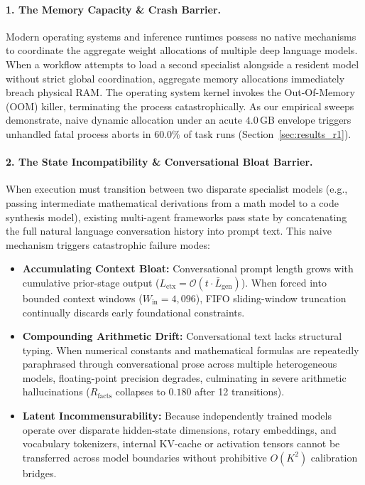 \paragraph{1. The Memory Capacity \& Crash Barrier.}
Modern operating systems and inference runtimes possess no native mechanisms to coordinate the aggregate weight allocations of multiple deep language models. When a workflow attempts to load a second specialist alongside a resident model without strict global coordination, aggregate memory allocations immediately breach physical RAM. The operating system kernel invokes the Out-Of-Memory (OOM) killer, terminating the process catastrophically. As our empirical sweeps demonstrate, naive dynamic allocation under an acute $4.0$\,GB envelope triggers unhandled fatal process aborts in $60.0\%$ of task runs (Section~\ref{sec:results_r1}).

\paragraph{2. The State Incompatibility \& Conversational Bloat Barrier.}
When execution must transition between two disparate specialist models (e.g., passing intermediate mathematical derivations from a math model to a code synthesis model), existing multi-agent frameworks pass state by concatenating the full natural language conversation history into prompt text. This naive mechanism triggers catastrophic failure modes:
\begin{itemize}
    \item \textbf{Accumulating Context Bloat:} Conversational prompt length grows with cumulative prior-stage output ($L_{\text{ctx}} = \mathcal{O}(t \cdot \bar{L}_{\text{gen}})$). When forced into bounded context windows ($W_{\text{in}} = 4,096$), FIFO sliding-window truncation continually discards early foundational constraints.
    \item \textbf{Compounding Arithmetic Drift:} Conversational text lacks structural typing. When numerical constants and mathematical formulas are repeatedly paraphrased through conversational prose across multiple heterogeneous models, floating-point precision degrades, culminating in severe arithmetic hallucinations ($R_{\text{facts}}$ collapses to $0.180$ after 12 transitions).
    \item \textbf{Latent Incommensurability:} Because independently trained models operate over disparate hidden-state dimensions, rotary embeddings, and vocabulary tokenizers, internal KV-cache or activation tensors cannot be transferred across model boundaries without prohibitive $O(K^2)$ calibration bridges.
\end{itemize}

